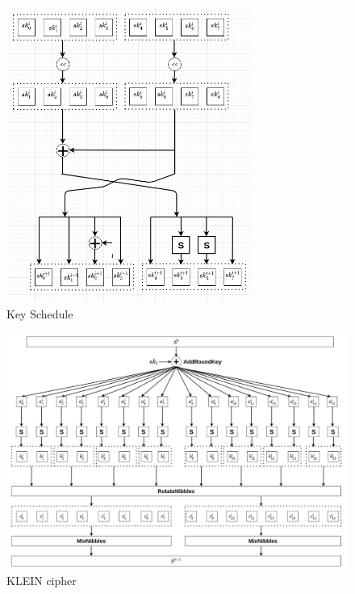 \documentclass[preprint]{transcrypto}
\begin{document}
\begin{figure}[h!]
    \centering
    \includegraphics[width=8cm, hieght= 10cm, keepaspectratio]{images/key_schedule.jpeg}
    \caption{Key Schedule}
    \label{fig:key schedule}
\end{figure}


    \begin{figure}[h!]
    \centering
    \includegraphics[width= \textwidth]{images/klein_cipher.jpeg}
    \caption{KLEIN cipher}
    \label{fig:overview}
\end{figure}
\end{document}
